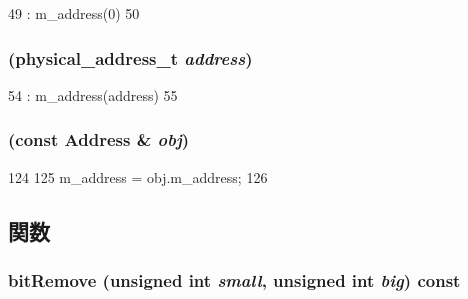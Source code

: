 \begin{DoxyCode}
49         : m_address(0)
50     { }
\end{DoxyCode}
\hypertarget{classAddress_ab13b386b7f0bf74bab346a3f2cbde303}{
\subsubsection[{Address}]{ ({\bf physical\_\-address\_\-t} {\em address})}}
\label{classAddress_ab13b386b7f0bf74bab346a3f2cbde303}



\begin{DoxyCode}
54         : m_address(address)
55     { }
\end{DoxyCode}
\hypertarget{classAddress_a3e2381cefd37090be9fda7e97116fe20}{
\subsubsection[{Address}]{ (const {\bf Address} \& {\em obj})}}
\label{classAddress_a3e2381cefd37090be9fda7e97116fe20}



\begin{DoxyCode}
124 {
125     m_address = obj.m_address;
126 }
\end{DoxyCode}


\subsection{関数}
\hypertarget{classAddress_a3915ce6c78db893a57a516943f9796d1}{
\subsubsection[{bitRemove}]{ bitRemove (unsigned int {\em small}, \/  unsigned int {\em big}) const}}
\label{classAddress_a3915ce6c78db893a57a516943f9796d1}



